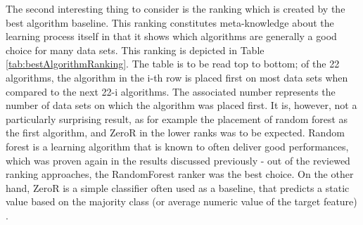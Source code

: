 The second interesting thing to consider is the ranking which is created by the best algorithm baseline. This ranking constitutes meta-knowledge about the learning process itself in that it shows which algorithms are generally a good choice for many data sets. This ranking is depicted in Table \ref{tab:bestAlgorithmRanking}. The table is to be read top to bottom; of the 22 algorithms, the algorithm in the i-th row is placed first on most data sets when compared to the next 22-i algorithms. The associated number represents the number of data sets on which the algorithm was placed first. It is, however, not a particularly surprising result, as for example the placement of random forest as the first algorithm, and ZeroR in the lower ranks was to be expected. Random forest is a learning algorithm that is known to often deliver good performances, which was proven again in the results discussed previously - out of the reviewed ranking approaches, the RandomForest ranker was the best choice. On the other hand, ZeroR is a simple classifier often used as a baseline, that predicts a static value based on the majority class (or average numeric value of the target feature) \cite{devasena2011effectiveness}.

